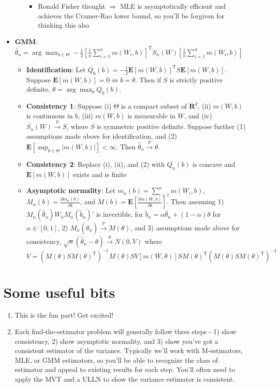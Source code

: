 \documentclass[12pt,english]{article}
\newcommand{\T}{\ensuremath{\text{T}}}
\begin{document}
\begin{itemize}
\begin{itemize}
		\begin{itemize}
			\item Ronald Fisher thought $\Rightarrow$ MLE is asymptotically efficient and achieves the Cramer-Rao lower bound, so you'll be forgiven for thinking this also
		\end{itemize}
	\end{itemize}
	\item \textbf{GMM}: $\hat{\theta}_{n} = \arg \max_{b \in \Theta} -\frac{1}{2} [\frac{1}{n} \sum_{i=1}^{n} m(W_{i}, b)]^{\T} S_{n}(W) [\frac{1}{n} \sum_{i=1}^{n} m(W_{i}, b)]$
	\begin{itemize}
		\item \textbf{Identification}: Let $Q_{0}(b) = -\frac{1}{2} \mathbf{E}[m(W, b)]^{\T} S \mathbf{E}[m(W, b)]$. Suppose $\mathbf{E}[m(W, b)] = 0 \Leftrightarrow b = \theta$. Then if $S$ is strictly positive definite, $\theta = \arg \max_{b} Q_{0}(b)$.
		\item \textbf{Consistency 1}: Suppose (i) $\Theta$ is a compact subset of $\mathbf{R}^{d}$, (ii) $m(W, b)$ is continuous in $b$, (iii) $m(W, b)$ is measurable in $W$, and (iv) $S_{n}(W) \overset{p}{\to} S$, where $S$ is symmetric positive definite. Suppose further (1) assumptions made above for identification, and (2) $\mathbf{E}[\sup_{b \in \Theta} |m(W, b)|] < \infty$. Then $\hat{\theta}_{n} \overset{p}{\to} \theta$.
		\item \textbf{Consistency 2}: Replace (i), (ii), and (2) with $Q_{n}(b)$ is concave and $\mathbf{E}[m(W, b)]$ exists and is finite
		\item \textbf{Asymptotic normality}: Let $m_{n}(b) = \sum_{i=1}^{n} m(W_{i}, b)$, $M_{n}(b) = \frac{\partial m_{n}(b)}{\partial b}$, and $M(b) = \mathbf{E}[\frac{\partial m(W, b)}{\partial b}]$. Then assuming 1)  $M_{n}(\hat{\theta}_{n}) W_{n} M_{n}(\tilde{b}_{n})'$ is invertible, for $\tilde{b}_{n} = \alpha \hat{\theta}_{n} + (1 - \alpha) \theta$ for $\alpha \in [0, 1]$, 2) $M_{n}(\hat{\theta}_{n}) \overset{p}{\to} M(\theta)$, and 3) assumptions made above for consistency, $\sqrt{n}(\hat{\theta}_{n} - \theta) \overset{d}{\to} N(0, V)$ where $V = (M(\theta)SM(\theta)^{\T})^{-1} M(\theta)SV[m(W, \theta)] SM(\theta)^{\T} (M(\theta)SM(\theta)^{\T})^{-1}$
	\end{itemize}
\end{itemize}

\section{Some useful bits}
\begin{enumerate}
	\item This is the fun part! Get excited!
	\item Each find-the-estimator problem will generally follow three steps - 1) show consistency, 2) show asymptotic normality, and 3) show you've got a consistent estimator of the variance. Typically we'll work with M-estimators, MLE, or GMM estimators, so you'll be able to recognize the class of estimator and appeal to existing results for each step. You'll often need to apply the MVT and a ULLN to show the variance estimator is consistent.
\end{enumerate}
\end{document}
